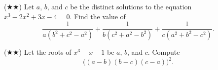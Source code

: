 \documentclass[11pt]{scrartcl}
\begin{document}
\begin{exercise}[CMIMC 2019/A6] ($\bigstar \bigstar$)
    Let $a$, $b$, and $c$ be the distinct solutions to the equation $x^3 - 2x^2 + 3x - 4 = 0$. Find the value of
    \[\frac1{a(b^2 + c^2 - a^2)} + \frac1{b(c^2 + a^2 - b^2)} + \frac1{c(a^2 + b^2 - c^2)}.\]
\end{exercise}

\begin{exercise} ($\bigstar \bigstar$)
    Let the roots of $x^3 - x - 1$ be $a$, $b$, and $c$. Compute
    \[\bigl((a - b)(b - c)(c - a)\bigr)^2.\]
\end{exercise}
\end{document}

